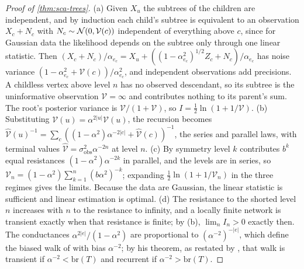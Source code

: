 \begin{proof}[Proof of \cref{thm:sca-trees}]
(a) Given $X_u$ the subtrees of the children are independent, and by induction each child's subtree is equivalent to an observation $X_c+N_c$ with $N_c\sim\mathcal{N}(0,\mathcal V(c))$ independent of everything above $c$, since for Gaussian data the likelihood depends on the subtree only through one linear statistic. Then $(X_c+N_c)/\alpha_{e_c}=X_u+((1-\alpha_{e_c}^2)^{1/2}Z_c+N_c)/\alpha_{e_c}$ has noise variance $(1-\alpha_{e_c}^2+\mathcal V(c))/\alpha_{e_c}^2$, and independent observations add precisions. A childless vertex above level $n$ has no observed descendant, so its subtree is the uninformative observation $\mathcal V=\infty$ and contributes nothing to its parent's sum. The root's posterior variance is $\mathcal V/(1+\mathcal V)$, so $I=\frac12\ln(1+1/\mathcal V)$. (b) Substituting $\mathcal V(u)=\alpha^{2|u|}\hat{\mathcal V}(u)$, the recursion becomes $\hat{\mathcal V}(u)^{-1}=\sum_c((1-\alpha^2)\alpha^{-2|c|}+\hat{\mathcal V}(c))^{-1}$, the series and parallel laws, with terminal values $\hat{\mathcal V}=\sigma_{\mathrm{obs}}^2\alpha^{-2n}$ at level $n$. (c) By symmetry level $k$ contributes $b^k$ equal resistances $(1-\alpha^2)\alpha^{-2k}$ in parallel, and the levels are in series, so $\mathcal V_n=(1-\alpha^2)\sum_{k=1}^n(b\alpha^2)^{-k}$; expanding $\frac12\ln(1+1/\mathcal V_n)$ in the three regimes gives the limits. Because the data are Gaussian, the linear statistic is sufficient and linear estimation is optimal. (d) The resistance to the shorted level $n$ increases with $n$ to the resistance to infinity, and a locally finite network is transient exactly when that resistance is finite; by (b), $\lim_nI_n>0$ exactly then. The conductances $\alpha^{2|e|}/(1-\alpha^2)$ are proportional to $(\alpha^{-2})^{-|e|}$, which define the biased walk of \citet{lyons1990random} with bias $\alpha^{-2}$; by his theorem, as restated by \citet{lyons1992random}, that walk is transient if $\alpha^{-2}<\mathrm{br}(T)$ and recurrent if $\alpha^{-2}>\mathrm{br}(T)$.
\end{proof}

